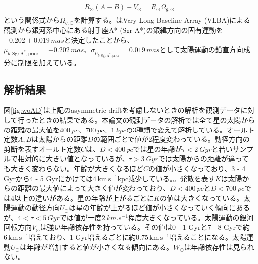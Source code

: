 \begin{align}
\begin{aligned}
	R_{\odot}(A-B) + V_{\odot} = R_{\odot}\Omega_{g,\odot}
\end{aligned}
\end{align}
という関係式から$\Omega_{g,\odot}$を計算する。\cite{RB14}はVery Long Baseline Array (VLBA)による観測から銀河系中心にある射手座A* (Sgr A*)の銀緯方向の固有運動を$-0.202\pm0.019\,\si{mas}$と決定したことから、$\mu_{b,\mathrm{Sgr\,A}^*,\mathrm{prior}} = -0.202\,\si{mas}、\sigma_{\mu_{b,\mathrm{Sgr\,A}^*,\mathrm{prior}}} = 0.019\,\si{mas}$として太陽運動の鉛直方向成分に制限を加えている。


\subsection{解析結果}
図\ref{fig:woAD}は上記のasymmetric driftを考慮しないときの解析を観測データに対して行ったときの結果である。本論文の観測データの解析では全て星の太陽からの距離の最大値を$\SI{400}{pc}、\SI{700}{pc}、\SI{1}{kpc}$の3種類で変えて解析している。オールト定数$A,B$は太陽からの距離$D$の範囲ごとで値が2程度変わっている。動径方向の剪断を表すオールト定数$C$は、$D<\SI{400}{pc}$では星の年齢が$\tau<\SI{2}{Gyr}$と若いサンプルで相対的に大きい値となっているが、$\tau>\SI{3}{Gyr}$では太陽からの距離が違っても大きく変わらない。年齢が大きくなるほど$C$の値が小さくなっており、3 - 4 Gyrから4 - 5 Gyrにかけては$4\,\mathrm{km\,s^{-1}kpc}$減少している。。発散を表す$K$は太陽からの距離の最大値によって大きく値が変わっており、$D<\SI{400}{pc}$と$D<\SI{700}{pc}$では4以上の違いがある。星の年齢が上がるごとに$K$の値は大きくなっている。太陽運動の動径方向$U_{\odot}$は星の年齢が上がるほど値が小さくなっていく傾向にあるが、$4<\tau<5\,\si{Gyr}$では値が一度$\SI{2}{km.s^{-1}}$程度大きくなっている。太陽運動の銀河回転方向$V_{\odot}$は強い年齢依存性を持っている。その値は0 - 1 Gyrと7 - 8 Gyrで約$6\,\mathrm{km\,s^{-1}}$増えており、1 Gyr増えるごとに約$0.75\,\mathrm{km\,s^{-1}}$増えることになる。太陽運動$U_{\odot}$は年齢が増加すると値が小さくなる傾向にある。$W_{\odot}$は年齢依存性は見られない。

